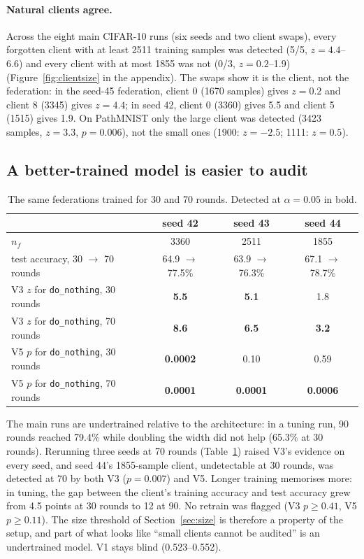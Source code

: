 \documentclass[11pt]{article}
\newcommand{\m}[1]{\texttt{#1}}
\newcommand{\dn}{\m{do\_nothing}}
\begin{document}
\paragraph{Natural clients agree.} Across the eight main CIFAR-10 runs (six
seeds and two client swaps), every forgotten client with at least 2511 training
samples was detected (5/5, $z=4.4$--6.6) and every client with at most 1855 was
not (0/3, $z=0.2$--1.9) (Figure~\ref{fig:clientsize} in the appendix). The swaps
show it is the client, not the federation: in the seed-45 federation, client 0
(1670 samples) gives $z=0.2$ and client 8 (3345) gives $z=4.4$; in seed 42,
client 0 (3360) gives 5.5 and client 5 (1515) gives 1.9. On PathMNIST only the
large client was detected (3423 samples, $z=3.3$, $p=0.006$), not the small ones
(1900: $z=-2.5$; 1111: $z=0.5$).

\subsection{A better-trained model is easier to audit}
\label{sec:longer}

\begin{table}[t]
\centering
\caption{The same federations trained for 30 and 70 rounds. Detected at
$\alpha=0.05$ in bold.}
\label{tab:longer}
\small
\begin{tabular}{lccc}
\toprule
 & seed 42 & seed 43 & seed 44\\
\midrule
$n_f$ & 3360 & 2511 & 1855\\
test accuracy, 30 $\to$ 70 rounds & 64.9 $\to$ 77.5\% & 63.9 $\to$ 76.3\% & 67.1 $\to$ 78.7\%\\
V3 $z$ for \dn, 30 rounds & \textbf{5.5} & \textbf{5.1} & 1.8\\
V3 $z$ for \dn, 70 rounds & \textbf{8.6} & \textbf{6.5} & \textbf{3.2}\\
V5 $p$ for \dn, 30 rounds & \textbf{0.0002} & 0.10 & 0.59\\
V5 $p$ for \dn, 70 rounds & \textbf{0.0001} & \textbf{0.0001} & \textbf{0.0006}\\
\bottomrule
\end{tabular}
\end{table}

The main runs are undertrained relative to the architecture: in a tuning run,
90 rounds reached 79.4\% while doubling the width did not help (65.3\% at 30
rounds). Rerunning three seeds at 70 rounds (Table~\ref{tab:longer}) raised
V3's evidence on every seed, and seed 44's 1855-sample client, undetectable at
30 rounds, was detected at 70 by both V3 ($p=0.007$) and V5. Longer training
memorises more: in tuning, the gap between the client's training accuracy and
test accuracy grew from 4.5 points at 30 rounds to 12 at 90. No retrain was
flagged (V3 $p\ge0.41$, V5 $p\ge0.11$). The size threshold of
Section~\ref{sec:size} is therefore a property of the setup, and part of what
looks like ``small clients cannot be audited'' is an undertrained model. V1
stays blind (0.523--0.552).
\end{document}
